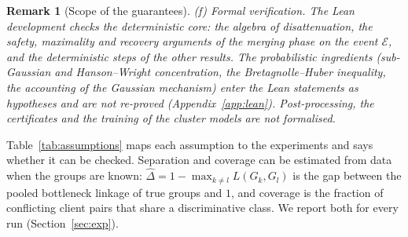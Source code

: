 \documentclass[pdflatex,sn-apa]{sn-jnl}
\theoremstyle{thmstyleone}
\theoremstyle{thmstylethree}
\newtheorem{remark}{Remark}
\begin{document}
\begin{remark}[Scope of the guarantees]
(f) \emph{Formal verification.} The Lean development checks the deterministic core: the algebra of disattenuation, the safety, maximality and recovery arguments of the merging phase on the event $\mathcal E$, and the deterministic steps of the other results. The probabilistic ingredients (sub-Gaussian and Hanson--Wright concentration, the Bretagnolle--Huber inequality, the accounting of the Gaussian mechanism) enter the Lean statements as hypotheses and are not re-proved (Appendix~\ref{app:lean}). Post-processing, the certificates and the training of the cluster models are not formalised.
\end{remark}

Table~\ref{tab:assumptions} maps each assumption to the experiments and says whether it can be checked. Separation and coverage can be estimated from data when the groups are known: $\hat\Delta=1-\max_{k\neq l}L(G_k,G_l)$ is the gap between the pooled bottleneck linkage of true groups and $1$, and coverage is the fraction of conflicting client pairs that share a discriminative class. We report both for every run (Section~\ref{sec:exp}).
\end{document}
